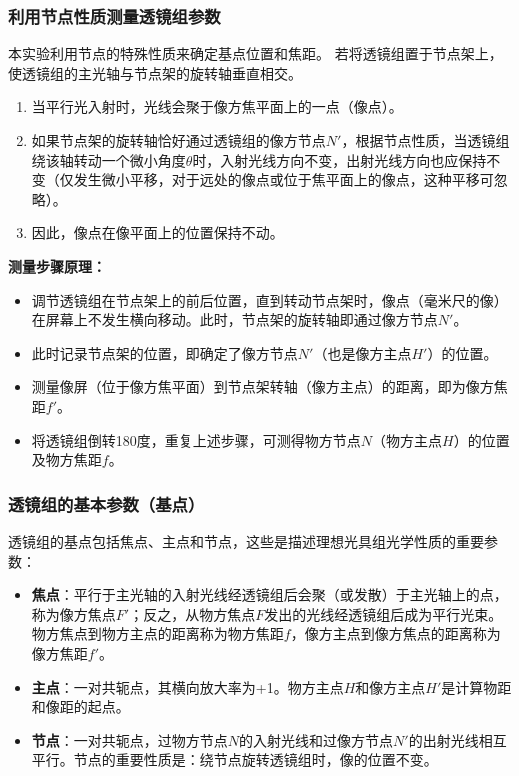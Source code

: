 \documentclass[dvipsnames, svgnames,a4paper,11pt]{article}
\begin{document}
	\subsubsection{利用节点性质测量透镜组参数}
	本实验利用节点的特殊性质来确定基点位置和焦距。
	若将透镜组置于节点架上，使透镜组的主光轴与节点架的旋转轴垂直相交。
	\begin{enumerate}
		\item 当平行光入射时，光线会聚于像方焦平面上的一点（像点）。
		\item 如果节点架的旋转轴恰好通过透镜组的像方节点$N'$，根据节点性质，当透镜组绕该轴转动一个微小角度$\theta$时，入射光线方向不变，出射光线方向也应保持不变（仅发生微小平移，对于远处的像点或位于焦平面上的像点，这种平移可忽略）。
		\item 因此，像点在像平面上的位置保持不动。
	\end{enumerate}
	\textbf{测量步骤原理：}
	\begin{itemize}
		\item 调节透镜组在节点架上的前后位置，直到转动节点架时，像点（毫米尺的像）在屏幕上不发生横向移动。此时，节点架的旋转轴即通过像方节点$N'$。
		\item 此时记录节点架的位置，即确定了像方节点$N'$（也是像方主点$H'$）的位置。
		\item 测量像屏（位于像方焦平面）到节点架转轴（像方主点）的距离，即为像方焦距$f'$。
		\item 将透镜组倒转180度，重复上述步骤，可测得物方节点$N$（物方主点$H$）的位置及物方焦距$f$。
	\end{itemize}

\subsubsection{透镜组的基本参数（基点）}

透镜组的基点包括焦点、主点和节点，这些是描述理想光具组光学性质的重要参数：

\begin{itemize}
	\item \textbf{焦点}：平行于主光轴的入射光线经透镜组后会聚（或发散）于主光轴上的点，称为像方焦点$F'$；反之，从物方焦点$F$发出的光线经透镜组后成为平行光束。物方焦点到物方主点的距离称为物方焦距$f$，像方主点到像方焦点的距离称为像方焦距$f'$。
	
	\item \textbf{主点}：一对共轭点，其横向放大率为+1。物方主点$H$和像方主点$H'$是计算物距和像距的起点。
	
	\item \textbf{节点}：一对共轭点，过物方节点$N$的入射光线和过像方节点$N'$的出射光线相互平行。节点的重要性质是：绕节点旋转透镜组时，像的位置不变。
\end{itemize}
\end{document}
